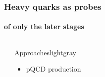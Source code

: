 \documentclass[aspectratio=169,11pt,usenames,dvipsnames]{beamer}
\begin{document}

\begin{frame}
    \frametitle{Heavy quarks as probes}
    \framesubtitle{of only the later stages}
    {
    \vspace{-5pt}
    \begin{columns}[onlytextwidth,t]
            \vspace{-20pt}
            \begin{center}
            \end{center}
        \vspace{10pt}
        \begin{center}
            \begin{custombox2transp}{\color{normal}Approaches}{lightgray}
                \small
                \begin{varwidth}{0.85\textwidth}
                \begin{itemize}\itemsep0em 
                    \item {}pQCD production\\[1pt]

\end{itemize}
\end{varwidth}
\end{custombox2transp}
\end{center}
\end{columns}}
\end{frame}
\end{document}
